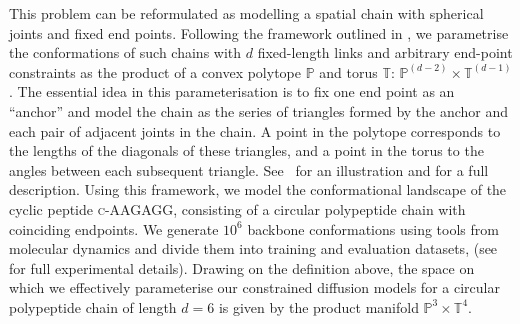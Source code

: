 This problem can be reformulated as modelling a spatial chain with spherical joints and fixed end points.
Following the framework outlined in \textcite{han2006inverse}, we parametrise the conformations of such chains with \(d\) fixed-length links and arbitrary end-point constraints as the product of a convex polytope \(\mathbb{P}\) and torus \(\mathbb{T}\): \(\mathbb{P}^{(d-2)} \times \mathbb{T}^{(d-1)}\).
The essential idea in this parameterisation is to fix one end point as an ``anchor'' and model the chain as the series of triangles formed by the anchor and each pair of adjacent joints in the chain.
A point in the polytope corresponds to the lengths of the diagonals of these triangles, and a point in the torus to the angles between each subsequent triangle.
See~ for an illustration and  for a full description.
Using this framework, we model the conformational landscape of the cyclic peptide \textsc{c-AAGAGG}, consisting of a circular polypeptide chain with coinciding endpoints.
We generate \(10^6\) backbone conformations using tools from molecular dynamics \parencite{eastman2017openmm, hornak2006comparison} and divide them into training and evaluation datasets, (see~ for full experimental details).
Drawing on the definition above, the space on which we effectively parameterise our constrained diffusion models for a circular polypeptide chain of length \(d=6\) is given by the product manifold \(\mathbb{P}^3 \times \mathbb{T}^4\).


